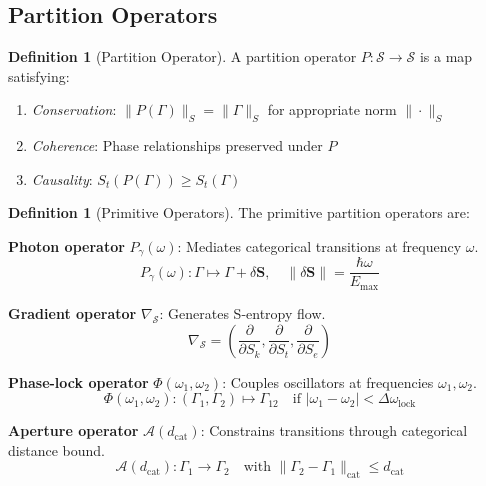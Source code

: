\documentclass[10pt,twocolumn]{article}
\theoremstyle{plain}
\theoremstyle{definition}
\newtheorem{definition}[theorem]{Definition}
\theoremstyle{remark}
\newcommand{\Sspace}{\mathcal{S}}
\newcommand{\Sk}{S_k}
\newcommand{\St}{S_t}
\newcommand{\Se}{S_e}
\newcommand{\Scoord}{\mathbf{S}}
\newcommand{\Gstate}{\Gamma}
\newcommand{\dcat}{d_{\mathrm{cat}}}
\newcommand{\Pop}{P}
\newcommand{\omegalock}{\Delta\omega_{\mathrm{lock}}}
\begin{document}
\subsection{Partition Operators}

\begin{definition}[Partition Operator]
\label{def:partition_operator}
A partition operator $\Pop: \Sspace \to \Sspace$ is a map satisfying:
\begin{enumerate}[label=(\roman*)]
\item \emph{Conservation}: $\|\Pop(\Gstate)\|_S = \|\Gstate\|_S$ for appropriate norm $\|\cdot\|_S$
\item \emph{Coherence}: Phase relationships preserved under $\Pop$
\item \emph{Causality}: $\St(\Pop(\Gstate)) \geq \St(\Gstate)$
\end{enumerate}
\end{definition}

\begin{definition}[Primitive Operators]
\label{def:primitives}
The primitive partition operators are:

\textbf{Photon operator} $\Pop_\gamma(\omega)$: Mediates categorical transitions at frequency $\omega$.
\begin{equation}
\Pop_\gamma(\omega): \Gstate \mapsto \Gstate + \delta\Scoord, \quad \|\delta\Scoord\| = \frac{\hbar\omega}{E_{\max}}
\end{equation}

\textbf{Gradient operator} $\nabla_{\Sspace}$: Generates S-entropy flow.
\begin{equation}
\nabla_{\Sspace} = \left(\frac{\partial}{\partial \Sk}, \frac{\partial}{\partial \St}, \frac{\partial}{\partial \Se}\right)
\end{equation}

\textbf{Phase-lock operator} $\Phi(\omega_1, \omega_2)$: Couples oscillators at frequencies $\omega_1, \omega_2$.
\begin{equation}
\Phi(\omega_1, \omega_2): (\Gstate_1, \Gstate_2) \mapsto \Gstate_{12} \quad \text{if } |\omega_1 - \omega_2| < \omegalock
\end{equation}

\textbf{Aperture operator} $\mathcal{A}(\dcat)$: Constrains transitions through categorical distance bound.
\begin{equation}
\mathcal{A}(\dcat): \Gstate_1 \to \Gstate_2 \quad \text{with } \|\Gstate_2 - \Gstate_1\|_{\mathrm{cat}} \leq \dcat
\end{equation}
\end{definition}
\end{document}
